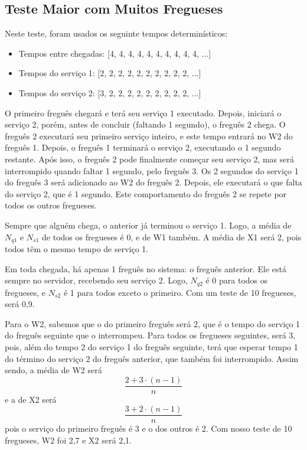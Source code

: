 \documentclass[a4paper,12pt]{report}
\begin{document}
\subsection{Teste Maior com Muitos Fregueses}

Neste teste, foram usados os seguinte tempos determinísticos:

\vspace{-1.5em}
\begin{itemize}
	\itemsep0pt
	\item Tempos entre chegadas: [4, 4, 4, 4, 4, 4, 4, 4, 4, 4, ...]
    \item Tempos do serviço 1: [2, 2, 2, 2, 2, 2, 2, 2, 2, 2, ...]
    \item Tempos do serviço 2: [3, 2, 2, 2, 2, 2, 2, 2, 2, 2, ...]
\end{itemize}

O primeiro freguês chegará e terá seu serviço 1 executado. Depois, iniciará o serviço 2, porém, antes de concluir (faltando 1 segundo), o freguês 2 chega. O freguês 2 executará seu primeiro serviço inteiro, e este tempo entrará no W2 do freguês 1. Depois, o freguês 1 terminará o serviço 2, executando o 1 segundo restante. Após isso, o freguês 2 pode finalmente começar seu serviço 2, mas será interrompido quando faltar 1 segundo, pelo freguês 3. Os 2 segundos do serviço 1 do freguês 3 será adicionado ao W2 do freguês 2. Depois, ele executará o que falta do serviço 2, que é 1 segundo. Este comportamento do freguês 2 se repete por todos os outros fregueses.

Sempre que alguém chega, o anterior já terminou o serviço 1. Logo, a média de $N_{q1}$ e $N_{s1}$ de todos os fregueses é 0, e de W1 também. A média de X1 será 2, pois todos têm o mesmo tempo de serviço 1.

Em toda chegada, há apenas 1 freguês no sistema: o freguês anterior. Ele está sempre no servidor, recebendo seu serviço 2. Logo, $N_{q2}$ é 0 para todos os fregueses, e $N_{s2}$ é 1 para todos exceto o primeiro. Com um teste de 10 fregueses, será 0,9.

Para o W2, sabemos que o do primeiro freguês será 2, que é o tempo do serviço 1 do freguês seguinte que o interrompeu. Para todos os fregueses seguintes, será 3, pois, além do tempo 2 do serviço 1 do freguês seguinte, terá que esperar tempo 1 do término do serviço 2 do freguês anterior, que também foi interrompido. Assim sendo, a média de W2 será
\[ \frac{2 + 3 \cdot (n-1)}{n}\]
e a de X2 será
\[ \frac{3 + 2 \cdot (n-1)}{n} \] pois o serviço do primeiro freguês é 3 e o dos outros é 2. Com nosso teste de 10 fregueses, W2 foi 2,7 e X2 será 2,1.
\end{document}
